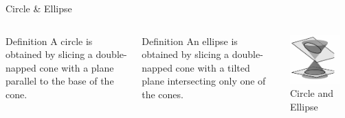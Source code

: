 \documentclass[14pt,aspectratio=169]{beamer}
\begin{document}
\begin{frame}{Circle \& Ellipse}
 \begin{columns}
     \begin{block}{Definition}
      A circle is obtained by slicing a double-napped cone with a plane parallel to the base of the cone.
     \end{block}
\begin{block}{Definition}
      An ellipse is obtained by slicing a double-napped cone with a tilted plane intersecting only one of the cones.

     \end{block}
      \centering
        \includegraphics[width=0.8\textwidth]{image08.png}\\Circle and Ellipse
    \end{columns}
\end{frame}
\end{document}
